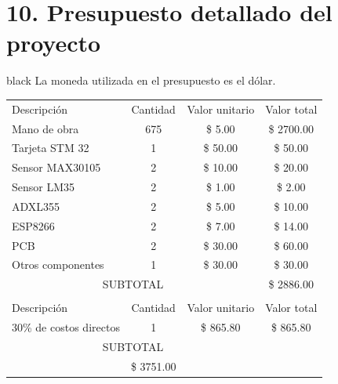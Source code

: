 \documentclass[11pt]{charter}
\begin{document}
\section{10. Presupuesto detallado del proyecto}
\label{sec:presupuesto}
\vspace{-10px}
\begin{consigna}{black}
La moneda utilizada en el presupuesto es el dólar.
\end{consigna}
\begin{table}[htpb]
\centering
\begin{tabularx}{\linewidth}{@{}|X|c|r|r|@{}}
\hline
\rowcolor[HTML]{C0C0C0} 
\multicolumn{4}{|c|}{\cellcolor[HTML]{C0C0C0}COSTOS DIRECTOS} \\ \hline
\rowcolor[HTML]{C0C0C0} 
Descripción &
  \multicolumn{1}{c|}{\cellcolor[HTML]{C0C0C0}Cantidad} &
  \multicolumn{1}{c|}{\cellcolor[HTML]{C0C0C0}Valor unitario} &
  \multicolumn{1}{c|}{\cellcolor[HTML]{C0C0C0}Valor total} \\ \hline
Mano de obra  &
  \multicolumn{1}{c|}{675} &
  \multicolumn{1}{c|}{\$ 5.00} &
  \multicolumn{1}{c|}{\$ 2700.00} \\ \hline
Tarjeta STM 32  &
  \multicolumn{1}{c|}{1} &
  \multicolumn{1}{c|}{\$ 50.00} &
  \multicolumn{1}{c|}{\$ 50.00} \\ \hline
Sensor MAX30105 &
  \multicolumn{1}{c|}{2} &
  \multicolumn{1}{c|}{\$ 10.00} &
  \multicolumn{1}{c|}{\$ 20.00} \\ \hline
Sensor LM35 &
  \multicolumn{1}{c|}{2} &
  \multicolumn{1}{c|}{\$ 1.00} &
  \multicolumn{1}{c|}{\$ 2.00} \\ \hline
ADXL355 &
  \multicolumn{1}{c|}{2} &
  \multicolumn{1}{c|}{\$ 5.00} &
  \multicolumn{1}{c|}{\$ 10.00} \\ \hline
ESP8266 &
  \multicolumn{1}{c|}{2} &
  \multicolumn{1}{c|}{\$ 7.00} &
  \multicolumn{1}{c|}{\$ 14.00} \\ \hline
PCB &
  \multicolumn{1}{c|}{2} &
  \multicolumn{1}{c|}{\$ 30.00} &
  \multicolumn{1}{c|}{\$ 60.00} \\ \hline
Otros componentes &
  \multicolumn{1}{c|}{1} &
  \multicolumn{1}{c|}{\$ 30.00} &
  \multicolumn{1}{c|}{\$ 30.00} \\ \hline
\multicolumn{3}{|c|}{SUBTOTAL} &
  \multicolumn{1}{c|}{\$ 2886.00} \\ \hline
\rowcolor[HTML]{C0C0C0} 
\multicolumn{4}{|c|}{\cellcolor[HTML]{C0C0C0}COSTOS INDIRECTOS} \\ \hline
\rowcolor[HTML]{C0C0C0} 
Descripción &
  \multicolumn{1}{c|}{\cellcolor[HTML]{C0C0C0}Cantidad} &
  \multicolumn{1}{c|}{\cellcolor[HTML]{C0C0C0}Valor unitario} &
  \multicolumn{1}{c|}{\cellcolor[HTML]{C0C0C0}Valor total} \\ \hline
30\% de costos directos &
  \multicolumn{1}{c|}{1} &
  \multicolumn{1}{c|}{\$ 865.80} &
  \multicolumn{1}{c|}{\$ 865.80} \\ \hline
\multicolumn{3}{|c|}{SUBTOTAL} &
  \multicolumn{1}{c|}{} \\ \hline
\rowcolor[HTML]{C0C0C0}
\multicolumn{3}{|c|}{TOTAL} & \$ 3751.00
   \\ \hline
\end{tabularx}%
\end{table}
\end{document}
